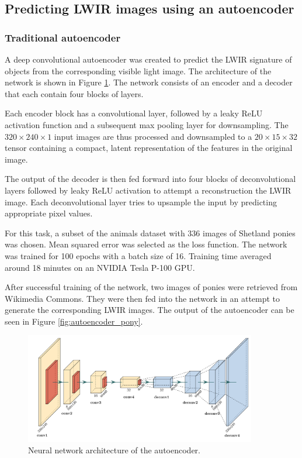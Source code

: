 \documentclass{l4proj}
\begin{document}
\subsection{Predicting LWIR images using an autoencoder}
\label{autoencoder_implementation}

\subsubsection{Traditional autoencoder}

A deep convolutional autoencoder was created to predict the LWIR signature of objects from the corresponding visible light image. The architecture of the network is shown in Figure \ref{fig:autoencoder_architecture}. The network consists of an encoder and a decoder that each contain four blocks of layers.

Each encoder block has a convolutional layer, followed by a leaky ReLU activation function and a subsequent max pooling layer for downsampling. The $320 \times 240 \times 1$ input images are thus processed and downsampled to a $20 \times 15 \times 32$ tensor containing a compact, latent representation of the features in the original image.

The output of the decoder is then fed forward into four blocks of deconvolutional layers followed by leaky ReLU activation to attempt a reconstruction the LWIR image. Each deconvolutional layer tries to upsample the input by predicting appropriate pixel values.

For this task, a subset of the animals dataset with 336 images of Shetland ponies was chosen. Mean squared error was selected as the loss function. The network was trained for 100 epochs with a batch size of 16. Training time averaged around 18 minutes on an NVIDIA Tesla P-100 GPU.

After successful training of the network, two images of ponies were retrieved from Wikimedia Commons. They were then fed into the network in an attempt to generate the corresponding LWIR images. The output of the autoencoder can be seen in Figure \ref{fig:autoencoder_pony}.

\begin{figure}[ht]
  \centering
  \includegraphics[width=0.9\textwidth]{images/autoencoder/autoencoder}
  \caption{Neural network architecture of the autoencoder.}
  \label{fig:autoencoder_architecture}
\end{figure}
\end{document}
